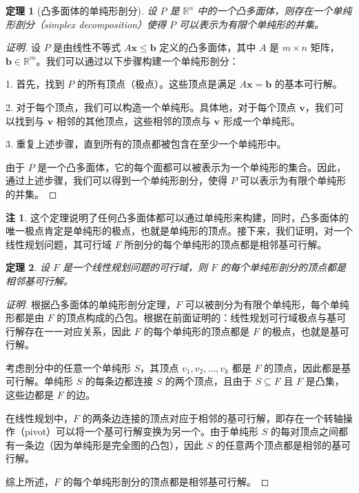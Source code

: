 \documentclass[12pt]{article}
\theoremstyle{plain}
\newtheorem{thm}{定理}[subsection]
\theoremstyle{definition}
\newtheorem{rmk}{注}[subsection]
\newenvironment{prf}[1][证明]{\begin{proof}[#1]}{\end{proof}}
\newcommand{\R}{\mathbb{R}}
\begin{document}
\begin{thm}[凸多面体的单纯形剖分]
    设 $P$ 是 $\R^n$ 中的一个凸多面体，则存在一个单纯形剖分（simplex decomposition）使得 $P$ 可以表示为有限个单纯形的并集。
\end{thm}
\begin{prf}
    设 $P$ 是由线性不等式 $A\bm{x} \leq \bm{b}$ 定义的凸多面体，其中 $A$ 是 $m \times n$ 矩阵，$\bm{b} \in \R^m$。我们可以通过以下步骤构建一个单纯形剖分：

    1. 首先，找到 $P$ 的所有顶点（极点）。这些顶点是满足 $A\bm{x} = \bm{b}$ 的基本可行解。

    2. 对于每个顶点，我们可以构造一个单纯形。具体地，对于每个顶点 $\bm{v}$，我们可以找到与 $\bm{v}$ 相邻的其他顶点，这些相邻的顶点与 $\bm{v}$ 形成一个单纯形。

    3. 重复上述步骤，直到所有的顶点都被包含在至少一个单纯形中。

    由于 $P$ 是一个凸多面体，它的每个面都可以被表示为一个单纯形的集合。因此，通过上述步骤，我们可以得到一个单纯形剖分，使得 $P$ 可以表示为有限个单纯形的并集。
\end{prf}
\begin{rmk}
    这个定理说明了任何凸多面体都可以通过单纯形来构建，同时，凸多面体的唯一极点肯定是单纯形的极点，也就是单纯形的顶点。接下来，我们证明，对一个线性规划问题，其可行域 $F$ 所剖分的每个单纯形的顶点都是相邻基可行解。
\end{rmk}

\begin{thm}
    设 $F$ 是一个线性规划问题的可行域，则 $F$ 的每个单纯形剖分的顶点都是相邻基可行解。
\end{thm}
\begin{prf}
    根据凸多面体的单纯形剖分定理，$F$ 可以被剖分为有限个单纯形，每个单纯形都是由 $F$ 的顶点构成的凸包。根据在前面证明的：线性规划可行域极点与基可行解存在一一对应关系，因此 $F$ 的每个单纯形的顶点都是 $F$ 的极点，也就是基可行解。

    考虑剖分中的任意一个单纯形 $S$，其顶点 $v_1, v_2, \dots, v_k$ 都是 $F$ 的顶点，因此都是基可行解。单纯形 $S$ 的每条边都连接 $S$ 的两个顶点，且由于 $S \subseteq F$ 且 $F$ 是凸集，这些边都是 $F$ 的边。

    在线性规划中，$F$ 的两条边连接的顶点对应于相邻的基可行解，即存在一个转轴操作（pivot）可以将一个基可行解变换为另一个。由于单纯形 $S$ 的每对顶点之间都有一条边（因为单纯形是完全图的凸包），因此 $S$ 的任意两个顶点都是相邻的基可行解。

    综上所述，$F$ 的每个单纯形剖分的顶点都是相邻基可行解。
\end{prf}
\end{document}
